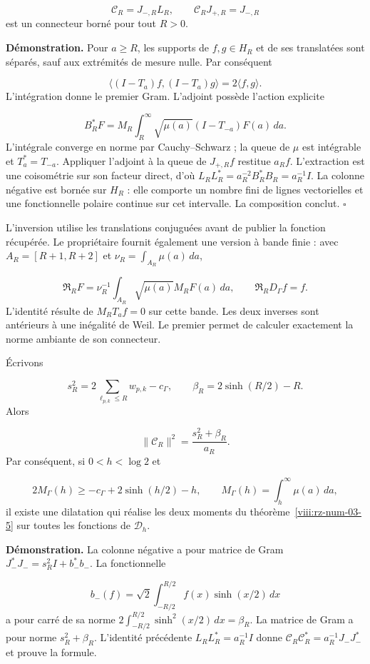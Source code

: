 \[
\mathcal C_R=J_{-,R}L_R,\qquad
\mathcal C_RJ_{+,R}=J_{-,R}
\]
est un connecteur borné pour tout \(R>0\).

\textbf{Démonstration.} Pour \(a\geq R\), les supports de \(f,g\in H_R\) et de ses translatées sont séparés, sauf aux extrémités de mesure nulle. Par conséquent

\[
\langle(I-T_a)f,(I-T_a)g\rangle=2\langle f,g\rangle.
\]
L’intégration donne le premier Gram. L’adjoint possède l’action explicite

\[
B_R^*F=M_R\int_R^\infty\sqrt{\mu(a)}(I-T_{-a})F(a)\,da.
\]
L’intégrale converge en norme par Cauchy–Schwarz ; la queue de \(\mu\) est intégrable et \(T_a^*=T_{-a}\). Appliquer l’adjoint à la queue de \(J_{+,R}f\) restitue \(a_Rf\). L’extraction est une coisométrie sur son facteur direct, d’où \(L_RL_R^*=a_R^{-2}B_R^*B_R=a_R^{-1}I\). La colonne négative est bornée sur \(H_R\) : elle comporte un nombre fini de lignes vectorielles et une fonctionnelle polaire continue sur cet intervalle. La composition conclut. \hfill\(\square\)

L'inversion utilise les translations conjuguées avant de publier la fonction récupérée. Le propriétaire fournit également une version à bande finie : avec \(A_R=[R+1,R+2]\) et \(\nu_R=\int_{A_R}\mu(a)\,da\),

\[
\mathfrak R_RF=\nu_R^{-1}\int_{A_R}
\sqrt{\mu(a)}M_RF(a)\,da,\qquad
\mathfrak R_RD_\Gamma f=f.
\]
L’identité résulte de \(M_RT_af=0\) sur cette bande. Les deux inverses sont antérieurs à une inégalité de Weil. Le premier permet de calculer exactement la norme ambiante de son connecteur.

Écrivons

\[
s_R^2=2\sum_{\ell_{p,k}\leq R}w_{p,k}-c_\Gamma,\qquad
\beta_R=2\sinh(R/2)-R.
\]
Alors

\[
\|\mathcal C_R\|^2=\frac{s_R^2+\beta_R}{a_R}.
\]
Par conséquent, si \(0<h<\log2\) et

\[
2M_\Gamma(h)\geq-c_\Gamma+2\sinh(h/2)-h,\qquad
M_\Gamma(h)=\int_h^\infty\mu(a)\,da,
\]
il existe une dilatation qui réalise les deux moments du théorème~\ref{viii:rz-num-03-5} sur toutes les fonctions de \(\mathcal D_h\).

\textbf{Démonstration.} La colonne négative a pour matrice de Gram \(J_-^*J_-=s_R^2I+b_-^*b_-\). La fonctionnelle

\[
b_-(f)=\sqrt2\int_{-R/2}^{R/2}f(x)\sinh(x/2)\,dx
\]
a pour carré de sa norme \(2\int_{-R/2}^{R/2}\sinh^2(x/2)\,dx=\beta_R\). La matrice de Gram a pour norme \(s_R^2+\beta_R\). L'identité précédente \(L_RL_R^*=a_R^{-1}I\) donne \(\mathcal C_R\mathcal C_R^*=a_R^{-1}J_-J_-^*\) et prouve la formule.

